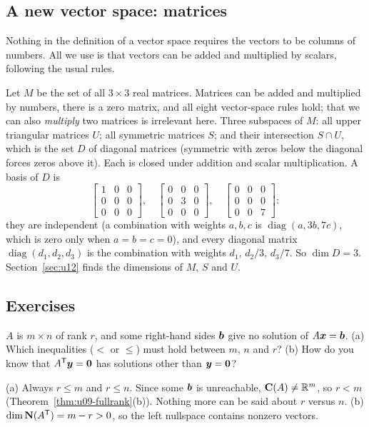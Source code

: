 \subsection{A new vector space: matrices}

Nothing in the definition of a vector space requires the vectors to be columns of numbers. All we
use is that vectors can be added and multiplied by scalars, following the usual rules.

\begin{example}\label{ex:u11-M}
Let $M$ be the set of all $3\times3$ real matrices. Matrices can be added and multiplied by
numbers, there is a zero matrix, and all eight vector-space rules hold; that we can also
\emph{multiply} two matrices is irrelevant here. Three subspaces of $M$: all upper triangular
matrices $U$; all symmetric matrices $S$; and their intersection $S\cap U$, which is the set $D$ of
diagonal matrices (symmetric with zeros below the diagonal forces zeros above it). Each is closed
under addition and scalar multiplication. A basis of $D$ is
\[
\begin{bmatrix}1&0&0\\0&0&0\\0&0&0\end{bmatrix},\quad
\begin{bmatrix}0&0&0\\0&3&0\\0&0&0\end{bmatrix},\quad
\begin{bmatrix}0&0&0\\0&0&0\\0&0&7\end{bmatrix}:
\]
they are independent (a combination with weights $a,b,c$ is $\operatorname{diag}(a,3b,7c)$, which
is zero only when $a=b=c=0$), and every diagonal matrix $\operatorname{diag}(d_1,d_2,d_3)$ is the
combination with weights $d_1,\,d_2/3,\,d_3/7$. So $\dim D=3$. Section~\ref{sec:u12} finds the
dimensions of $M$, $S$ and $U$.
\end{example}

\subsection{Exercises}

\begin{exercise}\label{exr:u11-ineq}
$A$ is $m\times n$ of rank $r$, and some right-hand sides $\boldsymbol{b}$ give no solution of
$A\boldsymbol{x}=\boldsymbol{b}$. (a) Which inequalities ($<$ or $\le$) must hold between $m$, $n$ and $r$?
(b) How do you know that $A^{\mathsf{T}}\boldsymbol{y}=\boldsymbol{0}$ has solutions other than $\boldsymbol{y}=\boldsymbol{0}$?
\end{exercise}
\begin{solution}
(a) Always $r\le m$ and $r\le n$. Since some $\boldsymbol{b}$ is unreachable, $\mathbf{C}(A)\ne\mathbb{R}^m$, so
$r<m$ (Theorem~\ref{thm:u09-fullrank}(b)). Nothing more can be said about $r$ versus $n$.
(b) $\dim\mathbf{N}(A^{\mathsf{T}})=m-r>0$, so the left nullspace contains nonzero vectors.
\end{solution}

